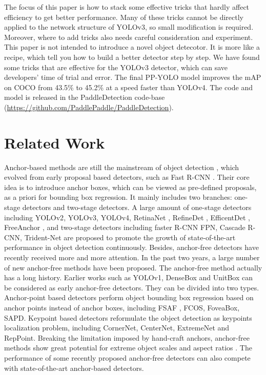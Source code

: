 \documentclass[10pt,twocolumn,letterpaper]{article}
\begin{document}
	The focus of this paper is how to stack some effective tricks that hardly affect efficiency to get better performance. Many of these tricks cannot be directly applied to the network structure of YOLOv3, so small modification is required. Moreover, where to add tricks also needs careful consideration and experiment. This paper is not intended to introduce a novel object detecotor. It is more like a recipe, which tell you how to build a better detector step by step. We have found some tricks that are effective for the YOLOv3 detector, which can save developers' time of trial and error. The final PP-YOLO model improves the mAP on COCO from 43.5\% to 45.2\% at a speed faster than YOLOv4. The code and model is released in the PaddleDetection code-base (\url{https://github.com/PaddlePaddle/PaddleDetection}).
	
	\section{Related Work}
	
	Anchor-based methods are still the mainstream of object detection \cite{faster-rcnn,fpn,yolov2,yolov3,yolov4,retinanet,SSD16,Fu2016dssd,freeanchor,cascade-rcnn,rfcn,GuidedAnchoring,tridentnet,GaussianYOLO2019,IoU-Net18}, which evolved from early proposal based detectors, such as Fast R-CNN \cite{FastRCNN15}. 
	Their core idea is to introduce anchor boxes, which can be viewed as pre-defined proposals,  as a priori for bounding box regression. It mainly includes two branches: one-stage detectors and two-stage detectors\cite{Survey2019}. A large amount of one-stage detectors including YOLOv2\cite{yolov2}, YOLOv3\cite{yolov3}, YOLOv4\cite{yolov4}, RetinaNet \cite{retinanet}, RefineDet \cite{refinedet}, EfficentDet \cite{Mingxing2020EfficientDet}, FreeAnchor \cite{freeanchor}, and two-stage detectors including faster R-CNN \cite{faster-rcnn} FPN\cite{fpn}, Cascade R-CNN\cite{cascade-rcnn}, Trident-Net\cite{tridentnet} are proposed to promote the growth of state-of-the-art performance in object detection continuously.
Besides,  anchor-free detectors have recently received more and more attention. In the past two years, a large number of new anchor-free methods have been proposed.
	The anchor-free method actually has a long history. Earlier works such as YOLOv1\cite{YOLO16}, DenseBox\cite{densebox} and UnitBox\cite{unitbox} can be considered as early anchor-free detectors.  They can be divided into two types. Anchor-point based detectors perform object bounding box regression based on anchor points instead of anchor boxes, including FSAF \cite{fsaf}, FCOS\cite{fcos}, FoveaBox\cite{foveabox}, SAPD\cite{sapd}. Keypoint based detectors reformulate the object detection as keypoints localization problem, including CornerNet\cite{cornernet}, CenterNet\cite{centernet}, ExtremeNet\cite{extremenet} and RepPoint\cite{reppoints}. Breaking the limitation imposed by hand-craft anchors, anchor-free methods show great potential for extreme object scales and aspect ratios \cite{mal}. The performance of some recently proposed anchor-free detectors can also compete with state-of-the-art anchor-based detectors. 
	
\end{document}
